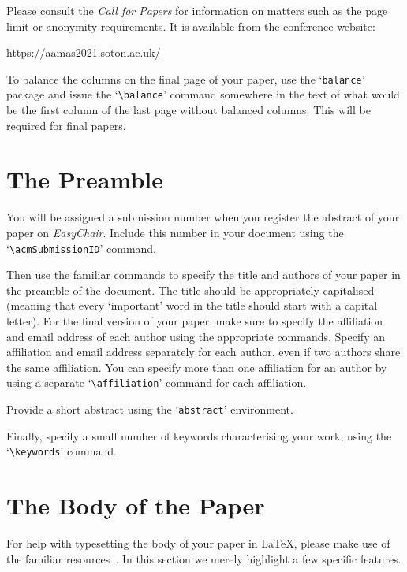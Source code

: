 \documentclass[sigconf]{aamas}
\begin{document}
Please consult the \emph{Call for Papers} for information on matters 
such as the page limit or anonymity requirements. It is available from
the conference website:
%
\begin{center}
\url{https://aamas2021.soton.ac.uk/}
\end{center}
%
To balance the columns on the final page of your paper, use the 
`\texttt{balance}' package and issue the `\verb|\balance|' command
 somewhere in the text of what would be the first column of the last 
 page without balanced columns. This will be required for final papers.


\section{The Preamble}

You will be assigned a submission number when you register the abstract 
of your paper on \textit{EasyChair}. Include this number in your 
document using the `\verb|\acmSubmissionID|' command.

Then use the familiar commands to specify the title and authors of your
paper in the preamble of the document. The title should be appropriately 
capitalised (meaning that every `important' word in the title should 
start with a capital letter). For the final version of your paper, make 
sure to specify the affiliation and email address of each author using 
the appropriate commands. Specify an affiliation and email address 
separately for each author, even if two authors share the same 
affiliation. You can specify more than one affiliation for an author by 
using a separate `\verb|\affiliation|' command for each affiliation.

Provide a short abstract using the `\texttt{abstract}' environment.
 
Finally, specify a small number of keywords characterising your work, 
using the `\verb|\keywords|' command. 


\section{The Body of the Paper}

For help with typesetting the body of your paper in \LaTeX\@, please 
make use of the familiar resources~\cite{Lam94}. In this section we 
merely highlight a few specific features. 
\end{document}
